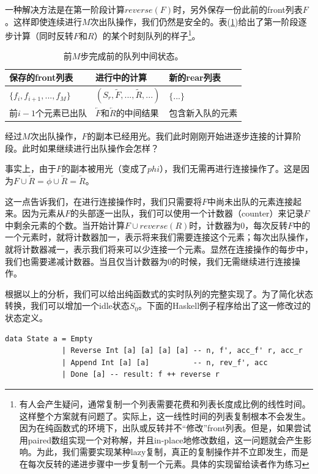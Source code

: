 \documentclass[UTF8]{article}
\begin{document}
一种解决方法是在第一阶段计算$reverse(F)$时，另外保存一份此前的front列表$F$。这样即使连续进行$M$次出队操作，我们仍然是安全的。表(\ref{tab:pop-before-m})给出了第一阶段逐步计算（同时反转$F$和$R$）的某个时刻队列的样子\footnote{有人会产生疑问，通常复制一个列表需要花费和列表长度成比例的线性时间。这样整个方案就有问题了。实际上，这一线性时间的列表复制根本不会发生。因为在纯函数式的环境下，出队或反转并不“修改”front列表。但是，如果尝试用paired数组实现一个对称解，并且in-place地修改数组，这一问题就会产生影响。为此，我们需要实现某种lazy复制，真正的复制操作并不立即发生，而是在每次反转的递进步骤中一步复制一个元素。具体的实现留给读者作为练习}。

\begin{table}
\centering
\begin{tabular}{l l l}
  保存的front列表 & 进行中的计算 & 新的rear列表 \\
  \hline
  $\{ f_i, f_{i+1}, ..., f_M \}$ & $(S_r, \tilde{F}, ..., \tilde{R}, ...)$ & $ \{ ... \}$ \\
  前$i-1$个元素已出队 & $\overleftarrow{F}$和$\overleftarrow{R}$的中间结果 & 包含新入队的元素
\end{tabular}
\caption{前$M$步完成前的队列中间状态。}
\label{tab:pop-before-m}
\end{table}

经过$M$次出队操作，$F$的副本已经用光。我们此时刚刚开始进逐步连接的计算阶段。此时如果继续进行出队操作会怎样？

事实上，由于$F$的副本被用光（变成了$phi$），我们无需再进行连接操作了。这是因为$F \cup \overleftarrow{R} = \phi \cup \overleftarrow{R} = \overleftarrow{R}$。

这一点告诉我们，在进行连接操作时，我们只需要将$F$中尚未出队的元素连接起来。因为元素从$F$的头部逐一出队，我们可以使用一个计数器（counter）来记录$F$中剩余元素的个数。当开始计算$F \cup reverse(R)$时，计数器为0，每次反转$F$中的一个元素时，就将计数器加一，表示将来我们需要连接这个元素；每次出队操作，就将计数器减一，表示我们将来可以少连接一个元素。显然在连接操作的每步中，我们也需要递减计数器。当且仅当计数器为0的时候，我们无需继续进行连接操作。

根据以上的分析，我们可以给出纯函数式的实时队列的完整实现了。为了简化状态转换，我们可以增加一个idle状态$S_0$。下面的Haskell例子程序给出了这一修改过的状态定义。

\lstset{language=Haskell}
\begin{lstlisting}
data State a = Empty
             | Reverse Int [a] [a] [a] [a] -- n, f', acc_f' r, acc_r
             | Append Int [a] [a]          -- n, rev_f', acc
             | Done [a] -- result: f ++ reverse r
\end{lstlisting}
\end{document}

